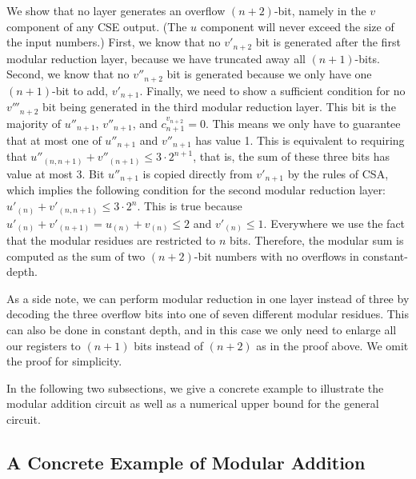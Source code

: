 \documentclass[twoside]{article}
\begin{document}
We show that no layer generates an overflow $(n+2)$-bit, namely in the
$v$ component of any CSE output. (The $u$ component will never exceed the
size of the input numbers.) First, we know that no $v'_{n+2}$ bit
is generated after the first modular reduction layer, because we have
truncated away all $(n+1)$-bits. Second, we know that no $v''_{n+2}$ bit is
generated because we only have one $(n+1)$-bit to add, $v'_{n+1}$.
Finally, we need to show a sufficient condition for no $v'''_{n+2}$ bit being
generated in the third modular reduction layer. This bit is the majority of
$u''_{n+1}$, $v''_{n+1}$, and $c^{v_{n+2}}_{n+1} = 0$. This means we only have
to guarantee that at most one of $u''_{n+1}$ and $v''_{n+1}$ has value 1.
This is equivalent to requiring that
$u''_{(n,n+1)} + v''_{(n+1)} \le 3\cdot 2^{n+1}$, that is, the sum of these
three bits has value at most $3$. Bit $u''_{n+1}$ is copied directly from
$v'_{n+1}$ by the rules of CSA, which implies the following condition for
the second modular reduction layer:
$u'_{(n)} + v'_{(n,n+1)} \le 3\cdot 2^n$. This is true because
$u'_{(n)} + v'_{(n+1)} = u_{(n)} + v_{(n)} \le 2$ and $v'_{(n)} \le 1$.
Everywhere
we use the fact that the modular residues are restricted to $n$ bits.
Therefore, the modular sum is computed as the sum of two $(n+2)$-bit numbers
with no overflows in constant-depth.
\square\,

As a side note, we can perform modular reduction in one layer instead of
three by decoding the three overflow bits into one of seven different
modular residues. This can also be done in constant depth, and in this case
we only need to enlarge all our registers to $(n+1)$ bits instead of $(n+2)$
as in the proof above. We omit the proof for simplicity.

In the following two subsections, we give a concrete example to illustrate
the modular addition circuit as well as a numerical upper bound for the
general circuit.

\subsection{A Concrete Example of Modular Addition}
\label{subsec:concrete}
\end{document}
